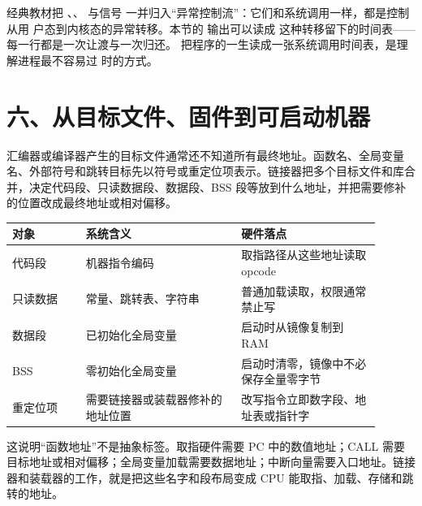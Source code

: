 \begin{classicnote}
经典教材把 、、 与信号
一并归入“异常控制流”：它们和系统调用一样，都是控制从用
户态到内核态的异常转移。本节的  输出可以读成
这种转移留下的时间表——每一行都是一次让渡与一次归还。
把程序的一生读成一张系统调用时间表，是理解进程最不容易过
时的方式。
\end{classicnote}




























\section{六、从目标文件、固件到可启动机器}

汇编器或编译器产生的目标文件通常还不知道所有最终地址。函数名、全局变量名、外部符号和跳转目标先以符号或重定位项表示。链接器把多个目标文件和库合并，决定代码段、只读数据段、数据段、BSS 段等放到什么地址，并把需要修补的位置改成最终地址或相对偏移。

\begin{longtable}{L{0.18\linewidth}L{0.38\linewidth}L{0.34\linewidth}}
\toprule
对象 & 系统含义 & 硬件落点 \\
\midrule
代码段 & 机器指令编码 & 取指路径从这些地址读取 opcode \\\tablerowrule
只读数据 & 常量、跳转表、字符串 & 普通加载读取，权限通常禁止写 \\\tablerowrule
数据段 & 已初始化全局变量 & 启动时从镜像复制到 RAM \\\tablerowrule
BSS & 零初始化全局变量 & 启动时清零，镜像中不必保存全量零字节 \\\tablerowrule
重定位项 & 需要链接器或装载器修补的地址位置 & 改写指令立即数字段、地址表或指针字 \\
\bottomrule
\end{longtable}

这说明“函数地址”不是抽象标签。取指硬件需要 PC 中的数值地址；CALL 需要目标地址或相对偏移；全局变量加载需要数据地址；中断向量需要入口地址。链接器和装载器的工作，就是把这些名字和段布局变成 CPU 能取指、加载、存储和跳转的地址。

